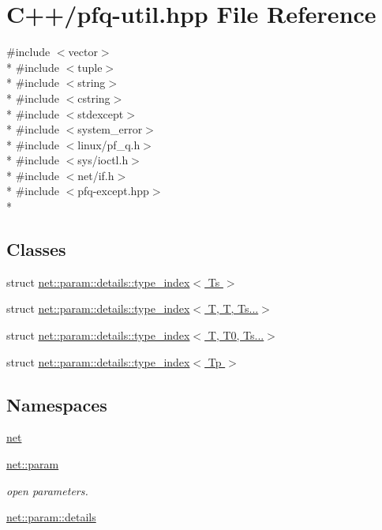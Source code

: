 \hypertarget{pfq-util_8hpp}{\section{C++/pfq-\/util.hpp File Reference}
\label{pfq-util_8hpp}
}
{\ttfamily \#include $<$vector$>$}\\*
{\ttfamily \#include $<$tuple$>$}\\*
{\ttfamily \#include $<$string$>$}\\*
{\ttfamily \#include $<$cstring$>$}\\*
{\ttfamily \#include $<$stdexcept$>$}\\*
{\ttfamily \#include $<$system\+\_\+error$>$}\\*
{\ttfamily \#include $<$linux/pf\+\_\+q.\+h$>$}\\*
{\ttfamily \#include $<$sys/ioctl.\+h$>$}\\*
{\ttfamily \#include $<$net/if.\+h$>$}\\*
{\ttfamily \#include $<$pfq-\/except.\+hpp$>$}\\*
\subsection*{Classes}
\begin{DoxyCompactItemize}
\item 
struct \hyperlink{structnet_1_1param_1_1details_1_1type__index}{net\+::param\+::details\+::type\+\_\+index$<$ Ts $>$}
\item 
struct \hyperlink{structnet_1_1param_1_1details_1_1type__index_3_01T_00_01T_00_01Ts_8_8_8_4}{net\+::param\+::details\+::type\+\_\+index$<$ T, T, Ts...$>$}
\item 
struct \hyperlink{structnet_1_1param_1_1details_1_1type__index_3_01T_00_01T0_00_01Ts_8_8_8_4}{net\+::param\+::details\+::type\+\_\+index$<$ T, T0, Ts...$>$}
\item 
struct \hyperlink{structnet_1_1param_1_1details_1_1type__index_3_01Tp_01_4}{net\+::param\+::details\+::type\+\_\+index$<$ Tp $>$}
\end{DoxyCompactItemize}
\subsection*{Namespaces}
\begin{DoxyCompactItemize}
\item 
 \hyperlink{namespacenet}{net}
\item 
 \hyperlink{namespacenet_1_1param}{net\+::param}
\begin{DoxyCompactList}\small\item\em open parameters. \end{DoxyCompactList}\item 
 \hyperlink{namespacenet_1_1param_1_1details}{net\+::param\+::details}
\end{DoxyCompactItemize}
